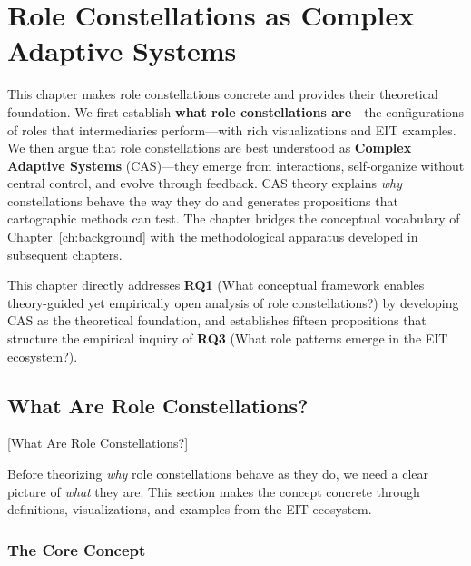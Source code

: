 \documentclass[../main.tex]{subfiles}
\begin{document}
\chapter{Role Constellations as Complex Adaptive Systems}
\margintoc

\begin{chapteroverview}
This chapter makes role constellations concrete and provides their theoretical foundation. We first establish \textbf{what role constellations are}---the configurations of roles that intermediaries perform---with rich visualizations and EIT examples. We then argue that role constellations are best understood as \textbf{Complex Adaptive Systems} (CAS)---they emerge from interactions, self-organize without central control, and evolve through feedback. CAS theory explains \emph{why} constellations behave the way they do and generates propositions that cartographic methods can test. The chapter bridges the conceptual vocabulary of Chapter~\ref{ch:background} with the methodological apparatus developed in subsequent chapters.

This chapter directly addresses \textbf{RQ1} (What conceptual framework enables theory-guided yet empirically open analysis of role constellations?) by developing CAS as the theoretical foundation, and establishes fifteen propositions that structure the empirical inquiry of \textbf{RQ3} (What role patterns emerge in the EIT ecosystem?).
\end{chapteroverview}


\section{What Are Role Constellations?}[What Are Role Constellations?]

Before theorizing \emph{why} role constellations behave as they do, we need a clear picture of \emph{what} they are. This section makes the concept concrete through definitions, visualizations, and examples from the EIT ecosystem.

\subsection{The Core Concept}
\end{document}
